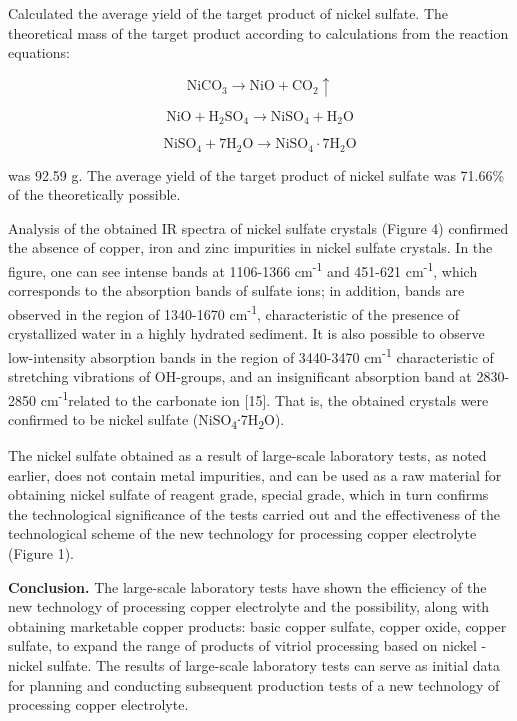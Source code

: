 Calculated the average yield of the target product of nickel sulfate.
The theoretical mass of the target product according to calculations
from the reaction equations:

\begin{equation}
\text{NiCO}_3 \to \text{NiO} + \text{CO}_2\uparrow
\end{equation}

\begin{equation}
\text{NiO} + \text{H}_2\text{SO}_4 \to \text{NiSO}_4 + \text{H}_2\text{O}
\end{equation}

\begin{equation}
\text{NiSO}_4 + 7\text{H}_2\text{O} \to \text{NiSO}_4 \cdot 7\text{H}_2\text{O}
\end{equation}

\begin{multicols}{2}
was 92.59 g. The average yield of the target product of nickel sulfate
was 71.66\% of the theoretically possible.

Analysis of the obtained IR spectra of nickel sulfate crystals (Figure
4) confirmed the absence of copper, iron and zinc impurities in nickel
sulfate crystals. In the figure, one can see intense bands at 1106-1366
cm\textsuperscript{-1} and 451-621 cm\textsuperscript{-1}, which
corresponds to the absorption bands of sulfate ions; in addition, bands
are observed in the region of 1340-1670 cm\textsuperscript{-1},
characteristic of the presence of crystallized water in a highly
hydrated sediment. It is also possible to observe low-intensity
absorption bands in the region of 3440-3470 cm\textsuperscript{-1}
characteristic of stretching vibrations of OH-groups, and an
insignificant absorption band at 2830-2850 cm\textsuperscript{-1}related
to the carbonate ion {[}15{]}. That is, the obtained crystals were
confirmed to be nickel sulfate
(NiSO\textsubscript{4}∙7H\textsubscript{2}O).

The nickel sulfate obtained as a result of large-scale laboratory tests,
as noted earlier, does not contain metal impurities, and can be used as
a raw material for obtaining nickel sulfate of reagent grade, special
grade, which in turn confirms the technological significance of the
tests carried out and the effectiveness of the technological scheme of
the new technology for processing copper electrolyte (Figure 1).

{\bfseries Conclusion.} The large-scale laboratory tests have shown the
efficiency of the new technology of processing copper electrolyte and
the possibility, along with obtaining marketable copper products: basic
copper sulfate, copper oxide, copper sulfate, to expand the range of
products of vitriol processing based on nickel - nickel sulfate. The
results of large-scale laboratory tests can serve as initial data for
planning and conducting subsequent production tests of a new technology
of processing copper electrolyte.
\end{multicols}


